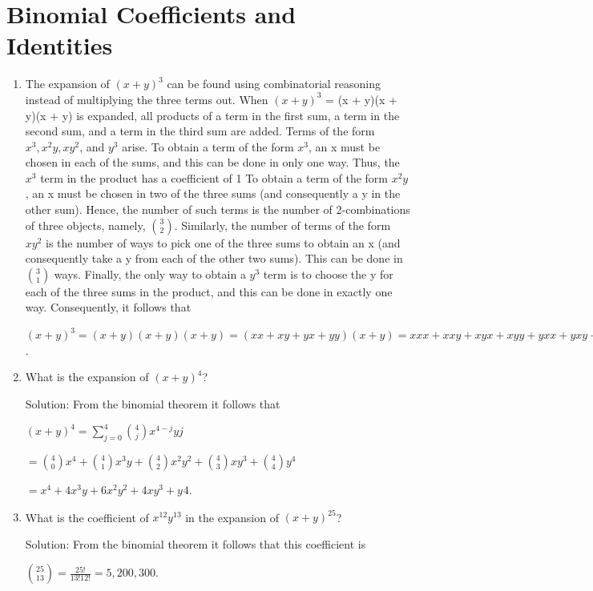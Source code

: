 \documentclass[11pt,a4paper]{book}
\begin{document}
\section{Binomial Coefficients and Identities}
\begin{enumerate}[label=Example~\arabic*]
\item The expansion of $(x + y)^{3}$ can be found using combinatorial reasoning instead of multiplying the three terms out.
When $(x + y)^{3}$ = (x + y)(x + y)(x + y) is expanded, all products of a term in the first sum, a term in the second sum, and a term in the third sum are added.
Terms of the form $x^{3}, x^{2}y, xy^{2}$, and $y^{3}$ arise.
To obtain a term of the form $x^{3}$, an x must be chosen in each of the sums, and this can be done in only one way.
Thus, the $x^{3}$ term in the product has a coefficient of 1
To obtain a term of the form $x^{2}y$, an x must be chosen in two of the three sums (and consequently a y in the other sum).
Hence, the number of such terms is the number of 2-combinations of three objects, namely, $\binom{3}{2}$.
Similarly, the number of terms of the form $xy^{2}$ is the number of ways to pick one of the three sums to obtain an x (and consequently take a y from each of the other two sums).
This can be done in $\binom{3}{1}$ ways.
Finally, the only way to obtain a $y^{3}$ term is to choose the y for each of the three sums in the product, and this can be done in exactly one way.
Consequently, it follows that

$(x + y)^{3} = (x + y)(x + y)(x + y) = (xx + xy + yx + yy)(x + y) = xxx + xxy + xyx + xyy + yxx + yxy + yyx + yyy = x^{3} + 3x^{2}y + 3xy^{2} + y^{3}$.

\item What is the expansion of $(x + y)^{4}$?

Solution: From the binomial theorem it follows that

$(x + y)^{4} = \sum_{j=0}^{4} \binom{4}{j}x^{4-j}y{j}$

$= \binom{4}{0}x^{4} + \binom{4}{1}x^{3}y + \binom{4}{2}x^{2}y^{2} + \binom{4}{3}xy^{3} + \binom{4}{4}y^{4}$

$= x^{4} + 4x^{3}y + 6x^{2}y^{2} + 4xy^{3} + y^{}4.$

\item What is the coefficient of $x^{12}y^{13}$ in the expansion of $(x + y)^{25}$?

Solution: From the binomial theorem it follows that this coefficient is

$\binom{25}{13} = \frac{25!}{13!12!} = 5,200,300.$


\end{enumerate}
\end{document}
